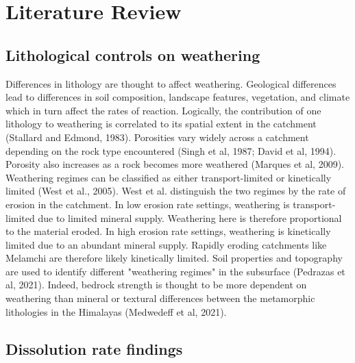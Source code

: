 

\section{Literature Review}

\subsection{Lithological controls on weathering}

Differences in lithology are thought to affect weathering. Geological differences lead to differences in soil composition, landscape features, vegetation, and climate which in turn affect the rates of reaction. Logically, the contribution of one lithology to weathering is correlated to its spatial extent in the catchment (Stallard and Edmond, 1983). Porosities vary widely across a catchment depending on the rock type encountered (Singh et al, 1987; David et al, 1994). Porosity also increases as a rock becomes more weathered (Marques et al, 2009). Weathering regimes can be classified as either transport-limited or kinetically limited (West et al., 2005). West et al. distinguish the two regimes by the rate of erosion in the catchment. In low erosion rate settings, weathering is transport-limited due to limited mineral supply. Weathering here is therefore proportional to the material eroded. In high erosion rate settings, weathering is kinetically limited due to an abundant mineral supply. Rapidly eroding catchments like Melamchi are therefore likely kinetically limited. Soil properties and topography are used to identify different "weathering regimes" in the subsurface (Pedrazas et al, 2021). Indeed, bedrock strength is thought to be more dependent on weathering than mineral or textural differences between the metamorphic lithologies in the Himalayas (Medwedeff et al, 2021).

\subsection{Dissolution rate findings}

